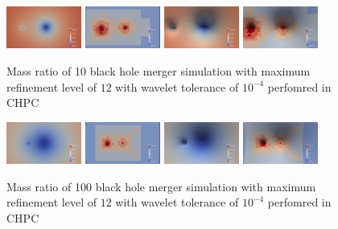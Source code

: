 \begin{figure}[H]
    \centering
    \includegraphics[width=0.22\textwidth]{figs/paraview/r10/img_slice_000050.png}
    \includegraphics[width=0.22\textwidth]{figs/paraview/r10/img_slice_level_000050.png}
    \includegraphics[width=0.22\textwidth]{figs/paraview/r10/img_slice_wbs_000050.png}
    \includegraphics[width=0.22\textwidth]{figs/paraview/r10/img_slice_level_wbs_000050.png}
    \caption{Mass ratio of 10 black hole merger simulation with maximum refinement level of $12$ with wavelet tolerance of $10^{-4}$ perfomred in CHPC \label{fig:pv:r10}}
\end{figure}


\begin{figure}[H]
    \centering
    \includegraphics[width=0.22\textwidth]{figs/paraview/r100/img_slice_000050.png}
    \includegraphics[width=0.22\textwidth]{figs/paraview/r100/img_slice_level_000050.png}
    \includegraphics[width=0.22\textwidth]{figs/paraview/r100/img_slice_wbs_000050.png}
    \includegraphics[width=0.22\textwidth]{figs/paraview/r100/img_slice_level_wbs_000050.png}
    \caption{Mass ratio of 100 black hole merger simulation with maximum refinement level of $12$ with wavelet tolerance of $10^{-4}$ perfomred in CHPC \label{fig:pv:r100}}
\end{figure}


